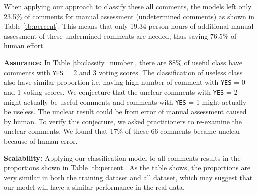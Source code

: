 When applying our approach to classify these all comments, the models left only 23.5\% of comments for manual assessment (undetermined comments) as shown in Table \ref{tb:percent}.
This means that only 19.34 person hours of additional manual assessment of these undermined comments are needed, thus saving 76.5\% of human effort.

%
%
%

\textbf{Assurance:} In Table \ref{tb:classify_number}, there are 88\% of useful class have comments with \texttt{YES} = 2 and 3 voting scores. The classification of useless class also have similar proportion i.e. having high number of comment with \texttt{YES} = 0 and 1 voting scores. We conjecture that the unclear comments with \texttt{YES} = 2 might actually be useful comments and comments with \texttt{YES} = 1 might actually be useless. The unclear result could be from error of manual assessment caused by human.
To verify this conjecture, we asked practitioners to re-examine the unclear comments.
We found that 17\% of these 66 comments became unclear because of human error.




\textbf{Scalability:} Applying our classification model to all comments results in the proportions shown in Table \ref{tb:percent}.
As the table shows, the proportions are very similar in both the training dataset and all dataset,
which may suggest that our model will have a similar performance in the real data.

